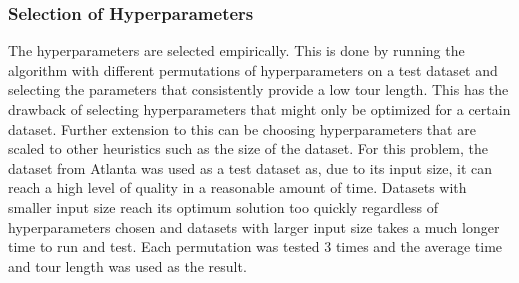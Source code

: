 \documentclass[sigconf]{acmart}
\begin{document}
\subsubsection{Selection of Hyperparameters}
The hyperparameters are selected empirically. This is done by running the algorithm with different permutations of hyperparameters on a test dataset and selecting the parameters that consistently provide a low tour length. This has the drawback of selecting hyperparameters that might only be optimized for a certain dataset. Further extension to this can be choosing hyperparameters that are scaled to other heuristics such as the size of the dataset.
For this problem, the dataset from Atlanta was used as a test dataset as, due to its input size, it can reach a high level of quality in a reasonable amount of time. Datasets with smaller input size reach its optimum solution too quickly regardless of hyperparameters chosen and datasets with larger input size takes a much longer time to run and test. Each permutation was tested 3 times and the average time and tour length was used as the result.
\end{document}
